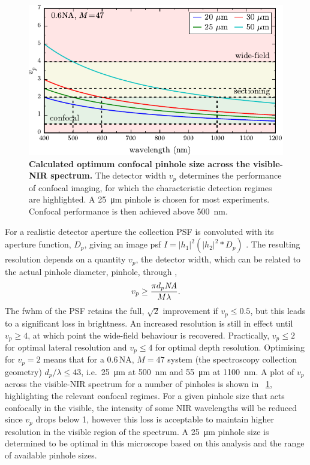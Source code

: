 \documentclass{article}
\begin{document}
\begin{figure}[bt]
\centering
\includegraphics{figures/confocal_pinhole_choice}
\caption[Calculated optimum confocal pinhole size across the visible-NIR spectrum]{\textbf{Calculated optimum confocal pinhole size across the visible-NIR spectrum.} The detector width $v_p$ determines the performance of confocal imaging, for which the characteristic detection regimes are highlighted. A \SI{25}{\micro\metre} pinhole is chosen for most experiments. Confocal performance is then achieved above \SI{500}{nm}.}
\label{fig:confocal_pinhole_choice}
\end{figure}

For a realistic detector aperture the collection PSF is convoluted with its aperture function, $D_p$, giving an image \gls{psf} $I=|h_1|^2(|h_2|^2 \ast D_p)$ \cite{wilson1987size}. The resulting resolution depends on a quantity $v_p$, the detector width, which can be related to the actual pinhole diameter, \gls{pinhole}, through \cite{wilson1987size},
\begin{equation}
	v_p \geq \frac{\pi d_p \mathit{NA}}{M \lambda}.
\end{equation}
The \gls{fwhm} of the PSF retains the full, $\sqrt{2}$ improvement if $v_p\leq0.5$, but this leads to a significant loss in brightness. An increased resolution is still in effect until $v_p\geq4$, at which point the wide-field behaviour is recovered. Practically, $v_p\leq2$ for optimal lateral resolution and $v_p\leq4$ for optimal depth resolution. Optimising for $v_p=2$ means that for a 0.6\,NA, $M=47$ system (the spectroscopy collection geometry) $d_p/\lambda\leq43$, i.e.\ \SI{25}{\micro\metre} at \SI{500}{nm} and \SI{55}{\micro\metre} at \SI{1100}{nm}. A plot of $v_p$ across the visible-NIR spectrum for a number of pinholes is shown in \figurename~\ref{fig:confocal_pinhole_choice}, highlighting the relevant confocal regimes. For a given pinhole size that acts confocally in the visible, the intensity of some NIR wavelengths will be reduced since $v_p$ drops below 1, however this loss is acceptable to maintain higher resolution in the visible region of the spectrum. A \SI{25}{\micro\metre} pinhole size is determined to be optimal in this microscope based on this analysis and the range of available pinhole sizes.
\end{document}
